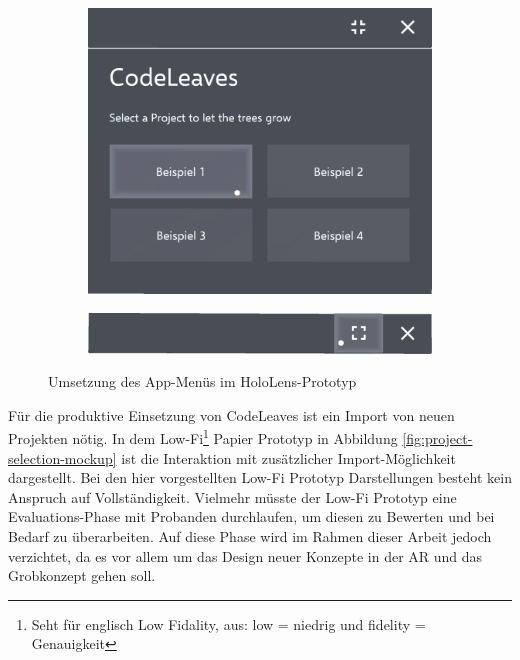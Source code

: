 \begin{figure}[htb]
  \centering
  \begin{subfigure}[t]{\textwidth}
    \centering
    \includegraphics[width=.8\textwidth]{figures/project-selection}
     \label{fig:project-selection}
  \end{subfigure}
  \par\bigskip
  \begin{subfigure}[t]{\textwidth}
    \centering
  	\includegraphics[width=.8\textwidth]{figures/title-bar}
  	 \label{fig:title-bar}
  \end{subfigure}
  \caption{Umsetzung des App-Menüs im HoloLens-Prototyp} \label{fig:app-menu}
\end{figure}

Für die produktive Einsetzung von CodeLeaves ist ein Import von neuen Projekten nötig. In dem Low-Fi\footnote{Seht für englisch Low Fidality, aus: low = niedrig und fidelity = Genauigkeit} Papier Prototyp in Abbildung \ref{fig:project-selection-mockup} ist die Interaktion mit zusätzlicher Import-Möglichkeit dargestellt. Bei den hier vorgestellten Low-Fi Prototyp Darstellungen besteht kein Anspruch auf Vollständigkeit. Vielmehr müsste der Low-Fi Prototyp eine Evaluations-Phase mit Probanden durchlaufen, um diesen zu Bewerten und bei Bedarf zu überarbeiten. Auf diese Phase wird im Rahmen dieser Arbeit jedoch verzichtet, da es vor allem um das Design neuer Konzepte in der AR und das Grobkonzept gehen soll.

